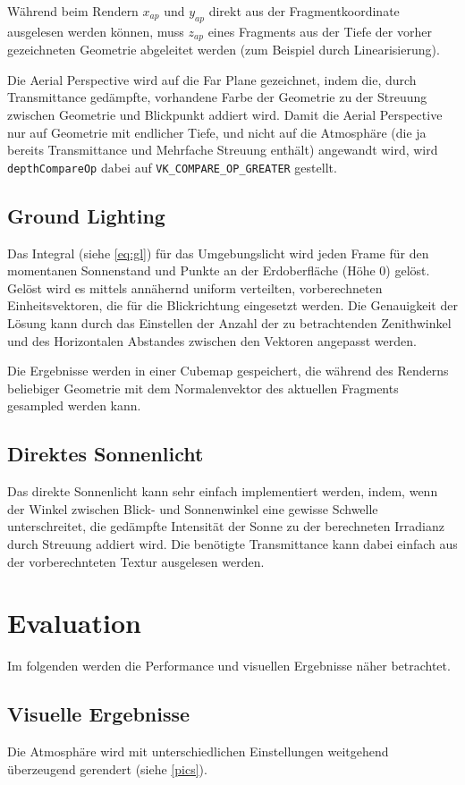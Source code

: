 Während beim Rendern $x_{ap}$ und $y_{ap}$ direkt aus der Fragmentkoordinate ausgelesen werden können, muss $z_{ap}$
eines Fragments aus der Tiefe der vorher gezeichneten Geometrie abgeleitet werden (zum Beispiel durch Linearisierung).

Die Aerial Perspective wird auf die Far Plane gezeichnet, indem die, durch Transmittance gedämpfte, vorhandene Farbe
der Geometrie zu der Streuung zwischen Geometrie und Blickpunkt addiert wird. Damit die Aerial Perspective nur auf
Geometrie mit endlicher Tiefe, und nicht auf die Atmosphäre (die ja bereits Transmittance und Mehrfache Streuung
enthält) angewandt wird, wird \texttt{depthCompareOp} dabei auf \texttt{VK\_COMPARE\_OP\_GREATER} gestellt.

\subsection{Ground Lighting}
Das Integral (siehe \cref{eq:gl}) für das Umgebungslicht wird jeden Frame für den momentanen Sonnenstand und Punkte an
der Erdoberfläche (Höhe 0) gelöst. Gelöst wird es mittels annähernd
uniform verteilten, vorberechneten Einheitsvektoren, die für die Blickrichtung eingesetzt werden. Die Genauigkeit der
Lösung kann durch das Einstellen der Anzahl der zu betrachtenden Zenithwinkel und des Horizontalen Abstandes zwischen
den Vektoren angepasst werden.

Die Ergebnisse werden in einer Cubemap gespeichert, die während des Renderns beliebiger Geometrie mit dem Normalenvektor
des aktuellen Fragments gesampled werden kann.

\subsection{Direktes Sonnenlicht}
Das direkte Sonnenlicht kann sehr einfach implementiert werden, indem, wenn der Winkel zwischen Blick- und Sonnenwinkel
eine gewisse Schwelle unterschreitet, die gedämpfte Intensität der Sonne zu der berechneten Irradianz durch Streuung
addiert wird. Die benötigte Transmittance kann dabei einfach aus der vorberechnteten Textur ausgelesen werden.

\section{Evaluation}

Im folgenden werden die Performance und visuellen Ergebnisse näher betrachtet.

\subsection{Visuelle Ergebnisse}
Die Atmosphäre wird mit unterschiedlichen Einstellungen weitgehend überzeugend gerendert (siehe \cref{pics}).

